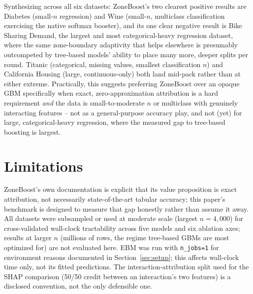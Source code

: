 \documentclass[11pt]{article}
\begin{document}
Synthesizing across all six datasets: ZoneBoost's two clearest positive
results are Diabetes (small-$n$ regression) and Wine (small-$n$,
multiclass classification exercising the native softmax booster), and its
one clear negative result is Bike Sharing Demand, the largest and most
categorical-heavy regression dataset, where the same zone-boundary
adaptivity that helps elsewhere is presumably outcompeted by tree-based
models' ability to place many more, deeper splits per round. Titanic
(categorical, missing values, smallest classification $n$) and California
Housing (large, continuous-only) both land mid-pack rather than at either
extreme. Practically, this suggests preferring ZoneBoost over an opaque
GBM specifically when exact, zero-approximation attribution is a hard
requirement \emph{and} the data is small-to-moderate $n$ or multiclass
with genuinely interacting features -- not as a general-purpose accuracy
play, and not (yet) for large, categorical-heavy regression, where the
measured gap to tree-based boosting is largest.

\section{Limitations}
\label{sec:limitations}

ZoneBoost's own documentation is explicit that its value proposition is
exact attribution, not necessarily state-of-the-art tabular accuracy; this
paper's benchmark is designed to measure that gap honestly rather than
assume it away. All datasets were subsampled or used at moderate scale
(largest $n=4{,}000$) for cross-validated wall-clock tractability across
five models and six ablation axes; results at larger $n$ (millions of rows,
the regime tree-based GBMs are most optimized for) are not evaluated here.
EBM was run with \texttt{n\_jobs=1} for environment reasons documented in
Section~\ref{sec:setup}; this affects wall-clock time only, not its fitted
predictions. The interaction-attribution split used for the SHAP comparison
(50/50 credit between an interaction's two features) is a disclosed
convention, not the only defensible one.
\end{document}
